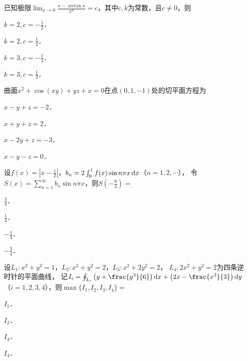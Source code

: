 \documentclass[plain,noanswer,medmath]{../../template/jnuexam}
\begin{document}




\begin{problem}
已知极限$\lim_{x \to 0} \frac{x - \arctan x}{x^k} = c$，其中$c,k$为常数，且$c \ne 0$，则\pickout{}
\begin{abcd}
\item $k = 2,c = - \frac{1}{2}$．
\item $k = 2,c = \frac{1}{2}$．
\item $k = 3,c = - \frac{1}{3}$．
\item $k = 3,c = \frac{1}{3}$．
\end{abcd}
\end{problem}


\begin{problem}
曲面$x^2 + \cos(xy) + yz + x = 0$在点$(0,1, - 1)$处的切平面方程为\pickout{}
\begin{abcd}
\item $x - y + z = - 2$．
\item $x + y + z = 2$．
\item $x - 2y + z = - 3$．
\item $x - y - z = 0$．
\end{abcd}
\end{problem}


\begin{problem}
设$f(x) = \left| x - \frac{1}{2} \right|$，$b_n = 2\int_0^1 f(x)\sin n\pi x\mathop{}\!\mathrm{d} x$（$n = 1,2, \cdots$），
令$S(x) = \sum_{n = 1}^{\infty}b_n\sin n\pi x$，则$S\left(- \frac{9}{4} \right) =$\pickout{}
\begin{abcd}
\item $\frac{3}{4}$．
\item $\frac{1}{4}$．
\item $- \frac{1}{4}$．
\item $- \frac{3}{4}$．
\end{abcd}
\end{problem}


\begin{problem}
设$L_1:x^2 + y^2 = 1$，$L_2:x^2 + y^2 = 2$，$L_3:x^2 + 2y^2 = 2$，
$L_4:2x^2 + y^2 = 2$为四条逆时针的平面曲线，
记$I_i = \oint_{L_i} \left(y + \frac{y^3}{6}\right)\dx + \left(2x - \frac{x^3}{3}\right)\dy$%
（$i = 1,2,3,4$），则$\max\{I_1,I_2,I_3,I_4\} =$\pickout{}
\begin{abcd}
\item $I_1$．
\item $I_2$．
\item $I_3$．
\item $I_4$．
\end{abcd}
\end{problem}
\end{document}
